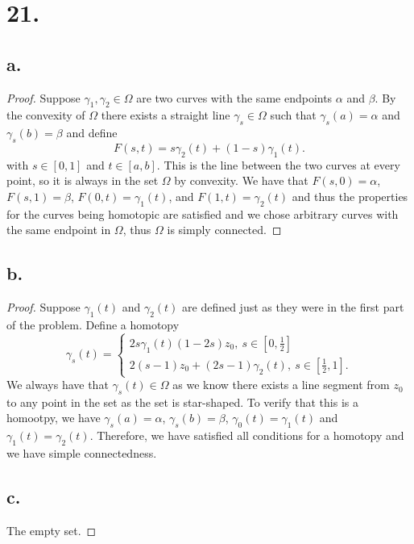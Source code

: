 \documentclass{article}
\begin{document}
\section*{21.}
\subsection*{a.}
\begin{proof}
  Suppose $\gamma_1, \gamma_2 \in \Omega$ are two curves with the same endpoints $\alpha$ and $\beta$. By the convexity of $\Omega$ there exists a straight line $\gamma_s \in  \Omega$ such that $\gamma_s(a) = \alpha$ and $\gamma_s(b) = \beta$ and define 
  \[
  F(s, t) = s\gamma_2(t) + (1 - s) \gamma_1(t).
  \]
  with $s \in [0, 1]$ and $t \in [a, b]$. 
  This is the line between the two curves at every point, so it is always in the set $\Omega$ by convexity. We have that $F(s, 0) = \alpha$, $F(s, 1) = \beta$, $F(0, t) = \gamma_1(t)$, and $F(1, t) = \gamma_2(t)$ and thus the properties for the curves being homotopic are satisfied and we chose arbitrary curves with the same endpoint in $\Omega$, thus $\Omega$ is simply connected. 
\end{proof}
\subsection*{b.}
\begin{proof}

  

  Suppose $\gamma_1(t)$ and $\gamma_2(t)$ are defined just as they were in the first part of the problem. 
  Define a homotopy
  \[
  \gamma_s(t) = \begin{cases}
    2 s \gamma_1(t) (1 - 2s)z_0, \ s \in \left[0, \frac{1}{2} \right] \\
    2(s - 1)z_0 + (2s - 1)\gamma_2(t), \ s \in\left[\frac{1}{2}, 1 \right].
  \end{cases}  
  \]
  We always have that $\gamma_s(t) \in \Omega$ as we know there exists a line segment from $z_0$ to any point in the set as the set is star-shaped. To verify that this is a homootpy, we have $\gamma_s(a) = \alpha$, $\gamma_s(b) = \beta$, $\gamma_0(t) = \gamma_1(t)$ and $\gamma_1(t) = \gamma_2(t)$. 
  Therefore, we have satisfied all conditions for a homotopy and we have simple connectedness.  
  \subsection*{c.}
  The empty set.  
\end{proof}
\end{document}
